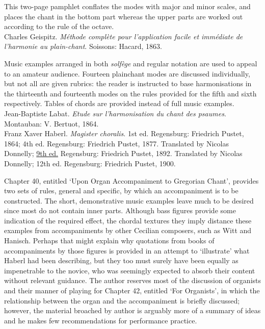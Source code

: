      \parindent=20pt
     \hangindent=20pt
     This two-page pamphlet conflates the modes with major and minor scales, and places the chant in the bottom part whereas the upper parts are worked out according to the rule of the octave.\\

    \parindent=0pt
    \hangindent=0pt
  Charles Geispitz. \emph{Méthode complète pour l'application facile et immédiate de l'harmonie au plain-chant}. Soissons:  Hacard, 1863.

     \parindent=20pt
     \hangindent=20pt
     Music examples arranged in both \emph{solfège} and regular notation are used to appeal to an amateur audience. Fourteen plainchant modes are discussed individually, but not all are given rubrics: the reader is instructed to base harmonisations in the thirteenth and fourteenth modes on the rules provided for the fifth and sixth respectively. Tables of chords are provided instead of full music examples.\\

    \parindent=0pt
    \hangindent=0pt
  \covid{}Jean-Baptiste Labat. \emph{Etude sur l'harmonisation du chant des psaumes}. Montauban:  V. Bertuot, 1864. \\

    \parindent=0pt
    \hangindent=0pt
  Franz Xaver Haberl. \emph{Magister choralis}. 1st ed. Regensburg:  Friedrich Pustet, 1864;  4th ed. Regensburg:  Friedrich Pustet, 1877. Translated by Nicolas Donnelly;  \underline{9th ed.} Regensburg:  Friedrich Pustet, 1892. Translated by Nicolas Donnelly;  12th ed. Regensburg:  Friedrich Pustet, 1900.

     \parindent=20pt
     \hangindent=20pt
     Chapter 40, entitled `Upon Organ Accompaniment to Gregorian Chant', provides two sets of rules, general and specific, by which an accompaniment is to be constructed. The short, demonstrative music examples leave much to be desired since most do not contain inner parts. Although bass figures provide some indication of the required effect, the chordal textures they imply distance these examples from accompaniments by other Cecilian composers, such as Witt and Hanisch.
Perhaps that might explain why quotations from books of accompaniments by those figures is provided in an attempt to `illustrate' what Haberl had been describing, but they too must surely have been equally as impenetrable to the novice, who was seemingly expected to absorb their content without relevant guidance. The author reserves most of the discussion of organists and their manner of playing for Chapter 42, entitled `For Organists', in which the relationship between the organ and the accompaniment is briefly discussed; however, the material broached by author is arguably more of a summary of ideas and he makes few recommendations for performance practice.\\

